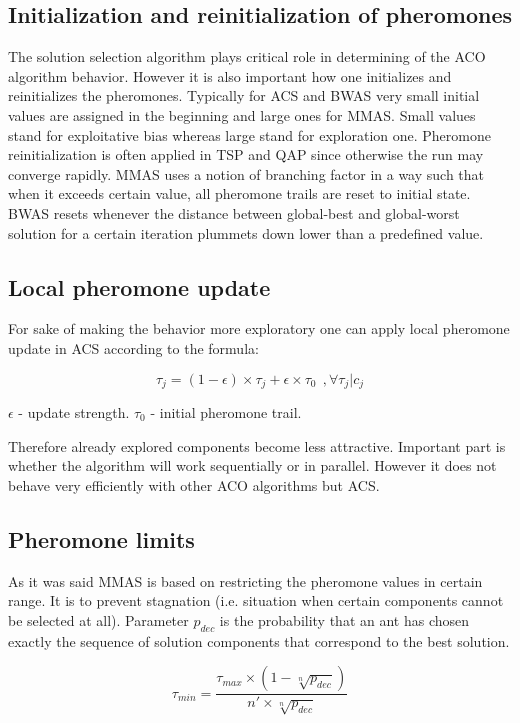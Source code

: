 \subsection{Initialization and reinitialization of pheromones}

The solution selection algorithm plays critical role in determining of the ACO algorithm behavior. However it is also important how one initializes and reinitializes the pheromones. Typically for ACS and BWAS very small initial values are assigned in the beginning and large ones for MMAS. Small values stand for exploitative bias whereas large stand for exploration one. Pheromone reinitialization is often applied in TSP and QAP since otherwise the run may converge rapidly. MMAS uses a notion of branching factor in a way such that when it exceeds certain value, all pheromone trails are reset to initial state. BWAS resets whenever the distance between global-best and global-worst solution for a certain iteration plummets down lower than a predefined value.


\subsection{Local pheromone update}
For sake of making the behavior more exploratory one can apply local pheromone update in ACS according to the formula:

\begin{equation}
\tau_j = (1 - \epsilon) \times \tau_j + \epsilon \times \tau_0 \ \ ,\forall \tau_j | c_j
\end{equation}

$\epsilon$ - update strength. $\tau_0$ - initial pheromone trail.

Therefore already explored components become less attractive. Important part is whether the algorithm will work sequentially or in parallel. However it does not behave very efficiently with other ACO algorithms but ACS.

\subsection{Pheromone limits}
As it was said MMAS is based on restricting the pheromone values in certain range. It is to prevent stagnation (i.e. situation when certain components cannot be selected at all). Parameter $p_{dec}$ is the probability that an ant has chosen exactly the sequence of solution components that correspond to the best solution.

\begin{equation}
\tau_{min} = \frac{\tau_{max} \times (1 - \sqrt[n]{p_{dec}})}{n' \times \sqrt[n]{p_{dec}}} 
\end{equation}


